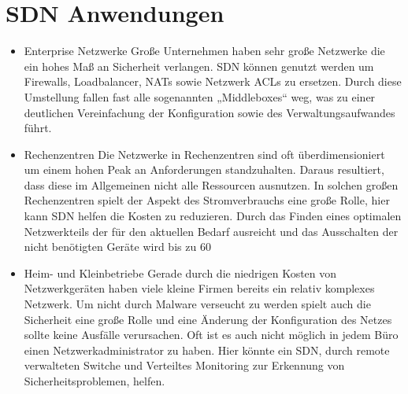 \documentclass[twoside,12pt]{scrartcl}
\begin{document}
\section{SDN Anwendungen}
\begin{itemize}
	\item Enterprise Netzwerke
	Große Unternehmen haben sehr große Netzwerke die ein hohes Maß an Sicherheit verlangen. SDN können genutzt werden um Firewalls, Loadbalancer, NATs sowie Netzwerk ACLs zu ersetzen. Durch diese Umstellung fallen fast alle sogenannten „Middleboxes“ weg, was zu einer deutlichen Vereinfachung der Konfiguration sowie des Verwaltungsaufwandes führt.
	\item Rechenzentren
	Die Netzwerke in Rechenzentren sind oft überdimensioniert um einem hohen Peak an Anforderungen standzuhalten. Daraus resultiert, dass diese im Allgemeinen nicht alle Ressourcen ausnutzen. In solchen großen Rechenzentren spielt der Aspekt des Stromverbrauchs eine große Rolle, hier kann SDN helfen die Kosten zu reduzieren. Durch das Finden eines optimalen Netzwerkteils der für den aktuellen Bedarf ausreicht und das Ausschalten der nicht benötigten Geräte wird bis zu 60%
	\item Heim- und Kleinbetriebe
	Gerade durch die niedrigen Kosten von Netzwerkgeräten haben viele kleine Firmen bereits ein relativ komplexes Netzwerk. Um nicht durch Malware verseucht zu werden spielt auch die Sicherheit eine große Rolle und eine Änderung der Konfiguration des Netzes sollte keine Ausfälle verursachen. Oft ist es auch nicht möglich in jedem Büro einen Netzwerkadministrator zu haben. Hier könnte ein SDN, durch remote verwalteten Switche und Verteiltes Monitoring zur Erkennung von Sicherheitsproblemen, helfen.
\end{itemize}
\end{document}
